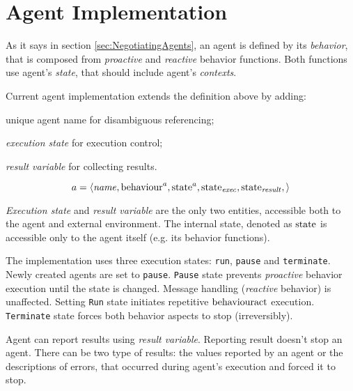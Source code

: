 \documentclass[../ThesisDoc]{subfiles}
\begin{document}
\providecommand{\rootdir}{..}


\section{Agent Implementation}


As it says in section \ref{sec:NegotiatingAgents}, an agent is defined by its
\emph{behavior}, that is composed from \emph{proactive} and \emph{reactive}
behavior functions. Both functions use agent's \emph{state}, that should include
agent's \emph{contexts}.

Current agent implementation extends the definition above by adding:
\begin{enumerate*}[1)]
  \item unique agent name for disambiguous referencing;
  \item \emph{execution state} for execution control;
  \item \emph{result variable} for collecting results.
\end{enumerate*}

$$ a = \left< \mathit{name},
              \mathrm{behaviour}^a,
              \mathrm{state}^a,
              \mathrm{state}_\mathit{exec},
              \mathrm{state}_\mathit{result},
       \right> $$

\noindent
\emph{Execution state} and \emph{result variable} are the only two entities,
accessible both to the agent and external environment. The internal state,
denoted as $\mathrm{state}$ is accessible only to the agent itself (e.g. its behavior functions).


The implementation uses three execution states: \texttt{run}, \texttt{pause}
and \texttt{terminate}. Newly created agents are set to \texttt{pause}.
\texttt{Pause} state prevents \emph{proactive} behavior execution until the state is changed.
Message handling (\emph{reactive} behavior) is unaffected.
Setting \texttt{Run} state initiates repetitive $\mathrm{behaviour}\mathrm{act}$ execution.
\texttt{Terminate} state forces both behavior aspects to stop (irreversibly).

Agent can report results using \emph{result variable}.
Reporting result doesn't stop an agent.
There can be two type of results: the values reported by an agent or
the descriptions of errors, that occurred during agent's execution
and forced it to stop.
\end{document}
